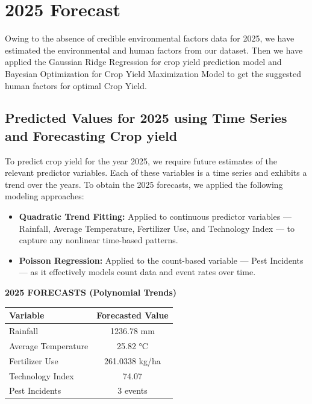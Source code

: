 \section{2025 Forecast}

Owing to the absence of credible environmental factors data for 2025, we have estimated the environmental and human factors from our dataset. Then we have applied the Gaussian Ridge Regression for crop yield prediction model and Bayesian Optimization for Crop Yield Maximization Model to get the suggested human factors for optimal Crop Yield.  

\subsection{Predicted Values for 2025 using Time Series and Forecasting Crop yield}

To predict crop yield for the year 2025, we require future estimates of the relevant predictor variables. Each of these variables is a time series and exhibits a trend over the years. To obtain the 2025 forecasts, we applied the following modeling approaches:

\begin{itemize}
    \item \textbf{Quadratic Trend Fitting:} Applied to continuous predictor variables — Rainfall, Average Temperature, Fertilizer Use, and Technology Index — to capture any nonlinear time-based patterns.
    \item \textbf{Poisson Regression:} Applied to the count-based variable — Pest Incidents — as it effectively models count data and event rates over time.
\end{itemize}

\begin{center}
\textbf{\large 2025 FORECASTS (Polynomial Trends)}

\vspace{0.5cm}

\begin{tabular}{>{\raggedright}p{5cm}c}
\toprule
\textbf{Variable} & \textbf{Forecasted Value} \\ 
\midrule
Rainfall & 1236.78 mm \\
Average Temperature & 25.82 °C \\
Fertilizer Use & 261.0338 kg/ha \\
Technology Index & 74.07 \\
Pest Incidents & 3 events \\
\bottomrule
\end{tabular}
\end{center}


